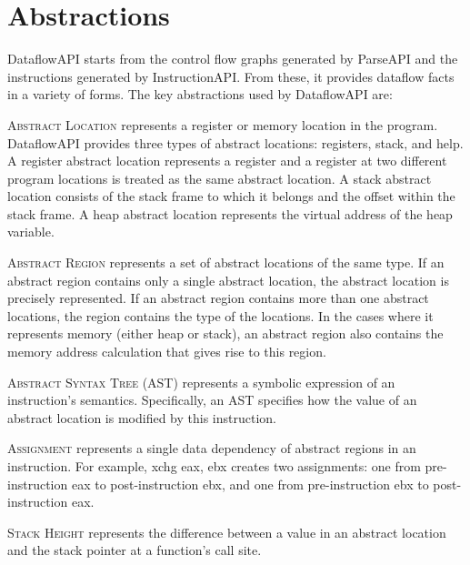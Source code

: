 \section{Abstractions}
\label{sec:abstractions}

DataflowAPI starts from the control flow graphs generated by ParseAPI and the instructions generated by InstructionAPI.
From these, it provides dataflow facts in a variety of forms. The key abstractions used by DataflowAPI are:

\begin{itemize}[leftmargin=0pt,label=$\circ$]
{\item {\scshape Abstract Location}
represents a register or memory location in the program.
DataflowAPI provides three types of abstract locations: registers, stack, and
help. A register abstract location represents a register and a register at two
different program locations is treated as the same abstract location. 
A stack abstract location consists of the stack frame to which it belongs and
the offset within the stack frame. 
A heap abstract location represents the virtual address of the heap variable.
}

{\item {\scshape Abstract Region}
represents a set of abstract locations of the same type. 
If an abstract region contains only a single abstract location, the
abstract location is precisely represented. 
If an abstract region contains more than one abstract locations, the region
contains the type of the locations. In the cases where it represents memory
(either heap or stack), an abstract region also contains 
the memory address calculation that gives rise to this region. 
}

{\item {\scshape Abstract Syntax Tree (AST)}
represents a symbolic expression of an instruction's semantics.
Specifically, an AST specifies how the value of an abstract location is modified by this
instruction.
}

{\item {\scshape Assignment}
represents a single data dependency of abstract regions in an instruction. For example, xchg eax, ebx creates two assignments: one from pre-instruction eax to post-instruction ebx, and one from pre-instruction ebx to post-instruction eax.
}

{\item {\scshape Stack Height}
represents the difference between a value in an abstract location and the stack pointer at a function's call site.
}
\end{itemize}



